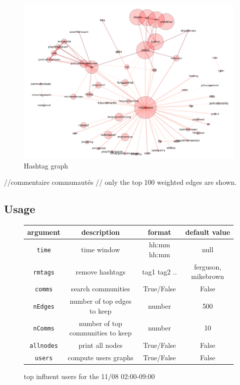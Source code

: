 \documentclass[a4paper,12pt]{report}
\begin{document}
\begin{figure}[H]
\centering
\includegraphics[width=\textwidth]{images/graphs/hashtags/11_08.png}
\caption{Hashtag graph}
\end{figure}

//commentaire communautés
// only the top 100 weighted edges are shown. 

\subsection{Usage}
\begin{figure}[H]
  \centering
\begin{tabular}{|c|c|c|c|}
\hline
argument & description & format & default value \\ \hline
\texttt{time} & time window & hh:mm hh:mm & null \\ \hline
\texttt{rmtags} & remove hashtags & tag1 tag2 ..  & ferguson, mikebrown \\ \hline
\texttt{comms} & search communities & True/False & False \\ \hline
\texttt{nEdges} & number of top edges to keep & number & 500 \\ \hline
\texttt{nComms} & number of top communities to keep & number & 10\\ \hline
\texttt{allnodes} & print all nodes & True/False & False \\ \hline
\texttt{users} & compute users graphs & True/False & False \\ \hline
\hline
\end{tabular}
\caption{top influent users for the 11/08 02:00-09:00}
\end{figure}
\end{document}
